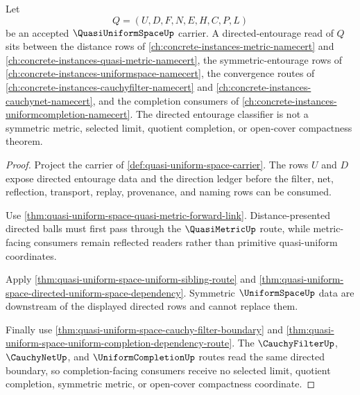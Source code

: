 \begin{theorem}
\label{thm:quasi-uniform-space-entourage-direction-sibling-route}
Let
$$
Q=(U,D,F,N,E,H,C,P,L)
$$
be an accepted $\QuasiUniformSpaceUp$ carrier. A directed-entourage read of $Q$ sits between the distance rows of \autoref{ch:concrete-instances-metric-namecert} and \autoref{ch:concrete-instances-quasi-metric-namecert}, the symmetric-entourage rows of \autoref{ch:concrete-instances-uniformspace-namecert}, the convergence routes of \autoref{ch:concrete-instances-cauchyfilter-namecert} and \autoref{ch:concrete-instances-cauchynet-namecert}, and the completion consumers of \autoref{ch:concrete-instances-uniformcompletion-namecert}. The directed entourage classifier is not a symmetric metric, selected limit, quotient completion, or open-cover compactness theorem.
\end{theorem}
\begin{proof}
Project the carrier of \autoref{def:quasi-uniform-space-carrier}. The rows $U$ and $D$ expose directed entourage data and the direction ledger before the filter, net, reflection, transport, replay, provenance, and naming rows can be consumed.

Use \autoref{thm:quasi-uniform-space-quasi-metric-forward-link}. Distance-presented directed balls must first pass through the $\QuasiMetricUp$ route, while metric-facing consumers remain reflected readers rather than primitive quasi-uniform coordinates.

Apply \autoref{thm:quasi-uniform-space-uniform-sibling-route} and \autoref{thm:quasi-uniform-space-directed-uniform-space-dependency}. Symmetric $\UniformSpaceUp$ data are downstream of the displayed directed rows and cannot replace them.

Finally use \autoref{thm:quasi-uniform-space-cauchy-filter-boundary} and \autoref{thm:quasi-uniform-space-uniform-completion-dependency-route}. The $\CauchyFilterUp$, $\CauchyNetUp$, and $\UniformCompletionUp$ routes read the same directed boundary, so completion-facing consumers receive no selected limit, quotient completion, symmetric metric, or open-cover compactness coordinate.
\end{proof}
